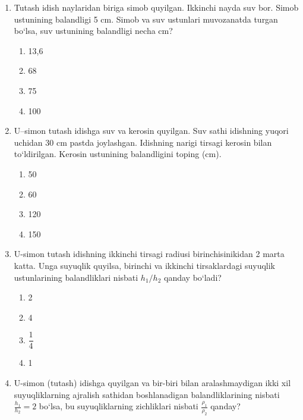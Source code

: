 \begin{enumerate}
\begin{enumerate}[label=\Alph*)]
\item 18
\item 16
\item 24
\item 20
\end{enumerate}


\item Tutash idish naylaridan biriga simob quyilgan. Ikkinchi nayda suv bor. 
Simob ustunining balandligi 5 cm. Simob va suv ustunlari muvozanatda 
turgan bo‘lsa, suv ustunining balandligi necha cm?

\begin{enumerate}[label=\Alph*)]
\item 13,6
\item 68
\item 75
\item 100
\end{enumerate}


\item U–simon tutash idishga suv va kerosin quyilgan. Suv sathi idishning yuqori uchidan 30 cm pastda joylashgan. Idishning narigi tirsagi kerosin bilan to‘ldirilgan. Kerosin ustunining balandligini toping (cm).

\begin{enumerate}[label=\Alph*)]
\item 50
\item 60
\item 120
\item 150
\end{enumerate}


\item U-simon tutash idishning ikkinchi tirsagi radiusi birinchisinikidan 
2 marta katta. Unga suyuqlik quyilsa, birinchi va ikkinchi tirsaklardagi 
suyuqlik ustunlarining balandliklari nisbati $h_1/h_2$ qanday bo‘ladi?

\begin{enumerate}[label=\Alph*)]
\item 2
\item 4
\item $\dfrac14$
\item 1
\end{enumerate}


\item U-simon (tutash) idishga quyilgan va bir-biri bilan aralashmaydigan ikki xil suyuqliklarning ajralish sathidan boshlanadigan balandliklarining nisbati $\frac{h_1}{h_2}=2$ bo‘lsa, bu suyuqliklarning zichliklari nisbati 
$\frac{\rho_1}{\rho_2}$ qanday?


\end{enumerate}
